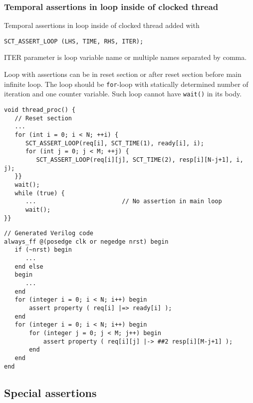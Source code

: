 \subsubsection{Temporal assertions in loop inside of clocked thread}

Temporal assertions in loop inside of clocked thread added with 
\begin{lstlisting}[style=mycpp]
SCT_ASSERT_LOOP (LHS, TIME, RHS, ITER);
\end{lstlisting}
%
ITER parameter is loop variable name or multiple names separated by comma.

Loop with assertions can be in reset section or after reset section before main infinite loop. The loop should be {\tt for}-loop with statically determined number of iteration and one counter variable. Such loop cannot have {\tt wait()} in its body. 

\begin{lstlisting}[style=mycpp]
void thread_proc() {
   // Reset section
   ...
   for (int i = 0; i < N; ++i) {
      SCT_ASSERT_LOOP(req[i], SCT_TIME(1), ready[i], i);
      for (int j = 0; j < M; ++j) {
         SCT_ASSERT_LOOP(req[i][j], SCT_TIME(2), resp[i][N-j+1], i, j);
   }}
   wait();                        
   while (true) { 
      ...                        // No assertion in main loop 
      wait();
}}
\end{lstlisting}
%
\begin{lstlisting}[style=myverilog]
// Generated Verilog code
always_ff @(posedge clk or negedge nrst) begin
   if (~nrst) begin
      ...
   end else 
   begin 
      ... 
   end 
   for (integer i = 0; i < N; i++) begin
       assert property ( req[i] |=> ready[i] );  
   end 
   for (integer i = 0; i < N; i++) begin
       for (integer j = 0; j < M; j++) begin
           assert property ( req[i][j] |-> ##2 resp[i][M-j+1] );  
       end
   end 
end
\end{lstlisting}

\subsection{Special assertions}\label{section:assert_special}

